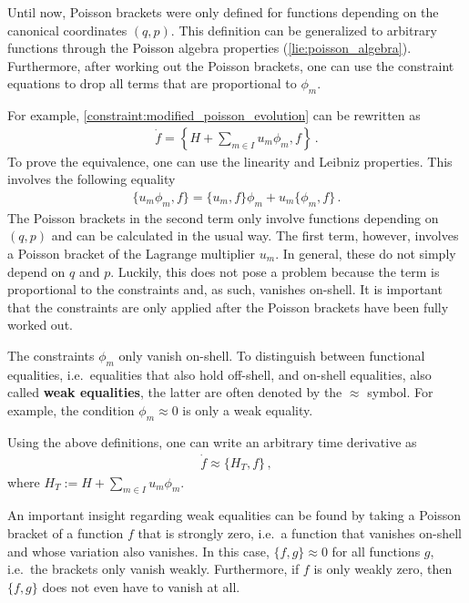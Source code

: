     \begin{method}
        Until now, Poisson brackets were only defined for functions depending on the canonical coordinates $(q,p)$. This definition can be generalized to arbitrary functions through the Poisson algebra properties (\cref{lie:poisson_algebra}). Furthermore, after working out the Poisson brackets, one can use the constraint equations to drop all terms that are proportional to $\phi_m$.

        For example, \cref{constraint:modified_poisson_evolution} can be rewritten as
        \begin{gather}
            \dot{f} = \left\{H + \sum_{m\in I}u_m\phi_m,f\right\}\,.
        \end{gather}
        To prove the equivalence, one can use the linearity and Leibniz properties. This involves the following equality
        \begin{gather}
            \{u_m\phi_m, f\} = \{u_m,f\}\phi_m + u_m\{\phi_m,f\}\,.
        \end{gather}
        The Poisson brackets in the second term only involve functions depending on $(q,p)$ and can be calculated in the usual way. The first term, however, involves a Poisson bracket of the Lagrange multiplier $u_m$. In general, these do not simply depend on $q$ and $p$. Luckily, this does not pose a problem because the term is proportional to the constraints and, as such, vanishes on-shell. It is important that the constraints are only applied after the Poisson brackets have been fully worked out.
    \end{method}

    \begin{notation}
        The constraints $\phi_m$ only vanish on-shell. To distinguish between functional equalities, i.e.~equalities that also hold off-shell, and on-shell equalities, also called \textbf{weak equalities}, the latter are often denoted by the $\approx$ symbol. For example, the condition $\phi_m\approx0$ is only a weak equality.
    \end{notation}
    Using the above definitions, one can write an arbitrary time derivative as
    \begin{gather}
        \dot{f}\approx\{H_T,f\}\,,
    \end{gather}
    where $H_T := H + \sum_{m\in I}u_m\phi_m$.

    \begin{remark}[Closure]
        An important insight regarding weak equalities can be found by taking a Poisson bracket of a function $f$ that is strongly zero, i.e.~a function that vanishes on-shell and whose variation also vanishes. In this case, $\{f,g\}\approx0$ for all functions $g$, i.e.~the brackets only vanish weakly. Furthermore, if $f$ is only weakly zero, then $\{f,g\}$ does not even have to vanish at all.
    \end{remark}

